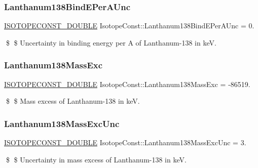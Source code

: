 \subsubsection{\texorpdfstring{Lanthanum138\+Bind\+E\+Per\+A\+Unc}{Lanthanum138BindEPerAUnc}}
{\footnotesize\ttfamily \mbox{\hyperlink{group___isotope_const-_macros_ga8f45a7272ce02c0b4c65c44636ed719a}{I\+S\+O\+T\+O\+P\+E\+C\+O\+N\+S\+T\+\_\+\+D\+O\+U\+B\+LE}} Isotope\+Const\+::\+Lanthanum138\+Bind\+E\+Per\+A\+Unc = 0.}

\$ \$ Uncertainty in binding energy per A of Lanthanum-\/138 in keV. \mbox{\label{group___isotope_const-_lanthanum-_la138_ga0bfe6d09caffcc559af2a3da66c2ea41}} 
\subsubsection{\texorpdfstring{Lanthanum138\+Mass\+Exc}{Lanthanum138MassExc}}
{\footnotesize\ttfamily \mbox{\hyperlink{group___isotope_const-_macros_ga8f45a7272ce02c0b4c65c44636ed719a}{I\+S\+O\+T\+O\+P\+E\+C\+O\+N\+S\+T\+\_\+\+D\+O\+U\+B\+LE}} Isotope\+Const\+::\+Lanthanum138\+Mass\+Exc = -\/86519.}

\$ \$ Mass excess of Lanthanum-\/138 in keV. \mbox{\label{group___isotope_const-_lanthanum-_la138_ga0f67d56d12c8f5c3745788f576de4422}} 
\subsubsection{\texorpdfstring{Lanthanum138\+Mass\+Exc\+Unc}{Lanthanum138MassExcUnc}}
{\footnotesize\ttfamily \mbox{\hyperlink{group___isotope_const-_macros_ga8f45a7272ce02c0b4c65c44636ed719a}{I\+S\+O\+T\+O\+P\+E\+C\+O\+N\+S\+T\+\_\+\+D\+O\+U\+B\+LE}} Isotope\+Const\+::\+Lanthanum138\+Mass\+Exc\+Unc = 3.}

\$ \$ Uncertainty in mass excess of Lanthanum-\/138 in keV. \mbox{\label{group___isotope_const-_lanthanum-_la138_gaa078f03b2e07837caf8a7bef1edd6a16}} 
